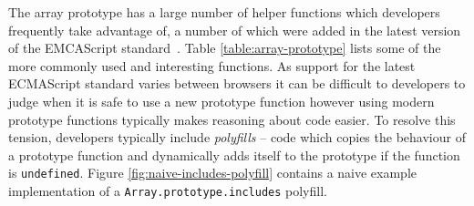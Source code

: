 \documentclass[]{final_report}
\begin{document}
The array prototype has a large number of helper functions which developers frequently take advantage of, a number of which were added in the latest version of the EMCAScript standard~\cite{EcmaScript}. Table \ref{table:array-prototype} lists some of the more commonly used and interesting functions. As support for the latest ECMAScript standard varies between browsers it can be difficult to developers to judge when it is safe to use a new prototype function however using modern prototype functions typically makes reasoning about code easier. To resolve this tension, developers typically include \textit{polyfills} -- code which copies the behaviour of a prototype function and dynamically adds itself to the prototype if the function is \lstinline|undefined|. Figure \ref{fig:naive-includes-polyfill} contains a naive example implementation of a \lstinline|Array.prototype.includes| polyfill.
\end{document}
